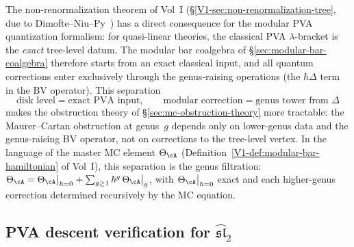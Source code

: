 \begin{remark}
\label{rem:pva-non-renormalization}
The non-renormalization theorem of Vol~I
(\S\ref*{V1-sec:non-renormalization-tree}, due to
Dimofte--Niu--Py~\cite{DNP2025}) has a direct consequence for the
modular PVA quantization formalism: for quasi-linear theories, the
classical PVA $\lambda$-bracket is the \emph{exact} tree-level datum.
The modular bar coalgebra of
\S\ref*{sec:modular-bar-coalgebra} therefore starts from an exact
classical input, and all quantum corrections enter exclusively
through the genus-raising operations (the $\hbar\Delta$ term in the
BV operator). This separation
\[
 \text{disk level} = \text{exact PVA input},
 \qquad
 \text{modular correction} = \text{genus tower from $\Delta$}
\]
makes the obstruction theory of
\S\ref*{sec:mc-obstruction-theory} more tractable:
the Maurer--Cartan obstruction at genus~$g$ depends only on
lower-genus data and the genus-raising BV operator, not on corrections
to the tree-level vertex. In the language of the master MC element
$\Theta_{\cA}$ (Definition~\ref*{V1-def:modular-bar-hamiltonian} of
Vol~I), this separation is the genus filtration:
$\Theta_{\cA} = \Theta_{\cA}\big|_{\hbar=0} +
\sum_{g \geq 1} \hbar^g\,\Theta_{\cA}\big|_{g}$, with
$\Theta_{\cA}\big|_{\hbar=0}$ exact and each higher-genus correction
determined recursively by the MC equation.
\end{remark}

\subsection{PVA descent verification for
$\widehat{\mathfrak{sl}}_2$}
\label{subsec:pva-descent-sl2}

